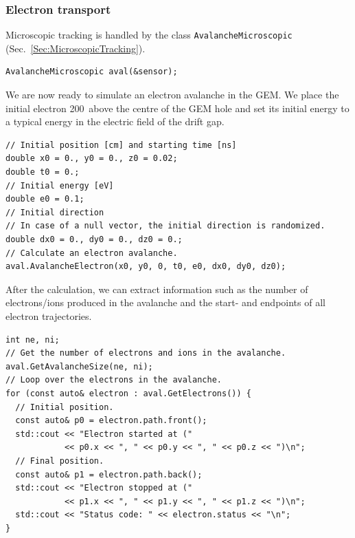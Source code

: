 \subsubsection{Electron transport}
Microscopic tracking is handled by the class 
\texttt{AvalancheMicroscopic} (Sec.~\ref{Sec:MicroscopicTracking}).
\begin{lstlisting}
AvalancheMicroscopic aval(&sensor);
\end{lstlisting}
We are now ready to simulate an electron avalanche in the GEM.
We place the initial electron 200\, above the centre of the GEM hole 
and set its initial energy to a typical energy in the electric field 
of the drift gap.
\begin{lstlisting}
// Initial position [cm] and starting time [ns]
double x0 = 0., y0 = 0., z0 = 0.02;
double t0 = 0.;
// Initial energy [eV]
double e0 = 0.1;
// Initial direction 
// In case of a null vector, the initial direction is randomized.
double dx0 = 0., dy0 = 0., dz0 = 0.;
// Calculate an electron avalanche.
aval.AvalancheElectron(x0, y0, 0, t0, e0, dx0, dy0, dz0);
\end{lstlisting}
After the calculation, we can extract information such as
the number of electrons/ions produced in the avalanche
and the start- and endpoints of all electron trajectories. 
\begin{lstlisting}
int ne, ni;
// Get the number of electrons and ions in the avalanche.
aval.GetAvalancheSize(ne, ni);
// Loop over the electrons in the avalanche.
for (const auto& electron : aval.GetElectrons()) {
  // Initial position.
  const auto& p0 = electron.path.front();
  std::cout << "Electron started at (" 
            << p0.x << ", " << p0.y << ", " << p0.z << ")\n";
  // Final position.
  const auto& p1 = electron.path.back();
  std::cout << "Electron stopped at (" 
            << p1.x << ", " << p1.y << ", " << p1.z << ")\n";
  std::cout << "Status code: " << electron.status << "\n";
}
\end{lstlisting}
